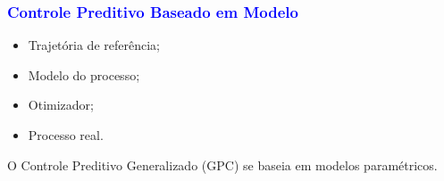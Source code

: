 \documentclass[aspectratio=169]{beamer}
\begin{document}

\begin{frame}
  \frametitle{\textcolor{blue}{\textbf{Controle Preditivo Baseado em Modelo}}}
  
  \begin{itemize}[label={}]
  	\item Trajetória de referência;
  	\item Modelo do processo;
  	\item Otimizador;
  	\item Processo real. 
  \end{itemize}
  
 O Controle Preditivo Generalizado (GPC) se baseia em modelos paramétricos.


\end{frame}
\end{document}

